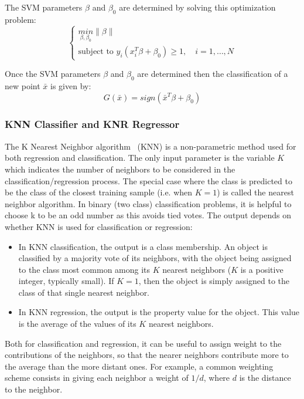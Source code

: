 The SVM parameters $\beta$ and $\beta_0$  are determined by solving this optimization problem:
\begin{equation}
\left\{\begin{matrix}
\underset{\beta,\beta_0}{min} \left \| \beta \right \|\\
\text{subject to } y_i(x_{i}^{T}\beta+\beta_0)\geq 1 , \quad i=1,\dots,N
\end{matrix}\right.
\end{equation}

Once the SVM parameters $\beta$ and $\beta_0$ are determined then the classification of a new point $\bar{x}$ is given by:
\begin{equation}
G(\bar{x})=sign(\bar{x}^T\beta+\beta_0)
\end{equation}


\subsubsection{KNN Classifier and KNR Regressor}
\label{sec:KNN_KNR}
The K Nearest Neighbor algorithm~\cite{altman_KNN} (KNN) is a non-parametric method used for both regression and classification. The only input parameter is the variable $K$ which indicates the number of neighbors to be considered in the classification/regression process. The special case where the class is predicted to be the class of the closest training sample (i.e. when $K = 1$) is called the nearest neighbor algorithm. In binary (two class) classification problems, it is helpful to choose k to be an odd number as this avoids tied votes. The output depends on whether KNN is used for classification or regression:
\begin{itemize}
\item In KNN classification, the output is a class membership. An object is classified by a majority vote of its neighbors, with the object being assigned to the class most common among its $K$ nearest neighbors ($K$ is a positive integer, typically small). If $K = 1$, then the object is simply assigned to the class of that single nearest neighbor.
\item In KNN regression, the output is the property value for the object. This value is the average of the values of its $K$ nearest neighbors.
\end{itemize}
Both for classification and regression, it can be useful to assign weight to the contributions of the neighbors, so that the nearer neighbors contribute more to the average than the more distant ones. For example, a common weighting scheme consists in giving each neighbor a weight of $1/d$, where $d$ is the distance to the neighbor.

